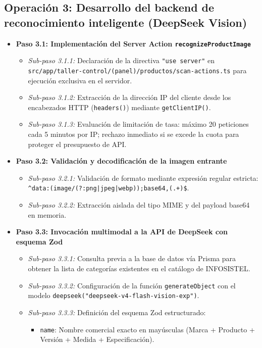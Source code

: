 \documentclass[11pt,a4paper]{article}
\begin{document}
\subsection{Operación 3: Desarrollo del backend de reconocimiento inteligente (DeepSeek Vision)}
\begin{itemize}
    \item \textbf{Paso 3.1: Implementación del Server Action \texttt{recognizeProductImage}}
    \begin{itemize}
        \item \textit{Sub-paso 3.1.1:} Declaración de la directiva \texttt{"use server"} en \texttt{src/app/taller-control/(panel)/productos/scan-actions.ts} para ejecución exclusiva en el servidor.
        \item \textit{Sub-paso 3.1.2:} Extracción de la dirección IP del cliente desde los encabezados HTTP (\texttt{headers()}) mediante \texttt{getClientIP()}.
        \item \textit{Sub-paso 3.1.3:} Evaluación de limitación de tasa: máximo 20 peticiones cada 5 minutos por IP; rechazo inmediato si se excede la cuota para proteger el presupuesto de API.
    \end{itemize}
    \item \textbf{Paso 3.2: Validación y decodificación de la imagen entrante}
    \begin{itemize}
        \item \textit{Sub-paso 3.2.1:} Validación de formato mediante expresión regular estricta: \texttt{\^{}data:(image/(?:png|jpeg|webp));base64,(.+)\$}.
        \item \textit{Sub-paso 3.2.2:} Extracción aislada del tipo MIME y del payload base64 en memoria.
    \end{itemize}
    \item \textbf{Paso 3.3: Invocación multimodal a la API de DeepSeek con esquema Zod}
    \begin{itemize}
        \item \textit{Sub-paso 3.3.1:} Consulta previa a la base de datos vía Prisma para obtener la lista de categorías existentes en el catálogo de INFOSISTEL.
        \item \textit{Sub-paso 3.3.2:} Configuración de la función \texttt{generateObject} con el modelo \texttt{deepseek("deepseek-v4-flash-vision-exp")}.
        \item \textit{Sub-paso 3.3.3:} Definición del esquema Zod estructurado:
        \begin{itemize}
            \item \texttt{name}: Nombre comercial exacto en mayúsculas (Marca + Producto + Versión + Medida + Especificación).

\end{itemize}
\end{itemize}
\end{itemize}
\end{document}
